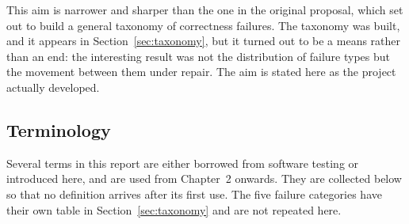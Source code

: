 \documentclass[12pt]{article}
\begin{document}
This aim is narrower and sharper than the one in the original proposal, which
set out to build a general taxonomy of correctness failures. The taxonomy was
built, and it appears in Section~\ref{sec:taxonomy}, but it turned out to be a
means rather than an end: the interesting result was not the distribution of
failure types but the movement between them under repair. The aim is stated
here as the project actually developed.

\subsection{Terminology}
\label{sec:terminology}

Several terms in this report are either borrowed from software testing or
introduced here, and are used from Chapter~2 onwards. They are collected below
so that no definition arrives after its first use. The five failure categories
have their own table in Section~\ref{sec:taxonomy} and are not repeated here.
\end{document}

